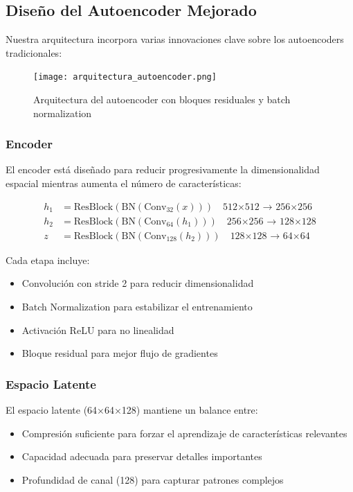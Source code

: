 \documentclass[conference]{IEEEtran}
\begin{document}
\subsection{Diseño del Autoencoder Mejorado}
Nuestra arquitectura incorpora varias innovaciones clave sobre los autoencoders tradicionales:

\begin{figure}[h]
\centering
\texttt{[image: arquitectura\_autoencoder.png]}
\caption{Arquitectura del autoencoder con bloques residuales y batch normalization}
\label{fig:arquitectura}
\end{figure}

\subsubsection{Encoder}
El encoder está diseñado para reducir progresivamente la dimensionalidad espacial mientras aumenta el número de características:

\begin{equation}
\begin{split}
h_1 &= \text{ResBlock}(\text{BN}(\text{Conv}_{32}(x))) \quad \text{512×512 → 256×256} \\
h_2 &= \text{ResBlock}(\text{BN}(\text{Conv}_{64}(h_1))) \quad \text{256×256 → 128×128} \\
z &= \text{ResBlock}(\text{BN}(\text{Conv}_{128}(h_2))) \quad \text{128×128 → 64×64}
\end{split}
\end{equation}

Cada etapa incluye:
\begin{itemize}
    \item Convolución con stride 2 para reducir dimensionalidad
    \item Batch Normalization para estabilizar el entrenamiento
    \item Activación ReLU para no linealidad
    \item Bloque residual para mejor flujo de gradientes
\end{itemize}

\subsubsection{Espacio Latente}
El espacio latente (64×64×128) mantiene un balance entre:
\begin{itemize}
    \item Compresión suficiente para forzar el aprendizaje de características relevantes
    \item Capacidad adecuada para preservar detalles importantes
    \item Profundidad de canal (128) para capturar patrones complejos
\end{itemize}
\end{document}
